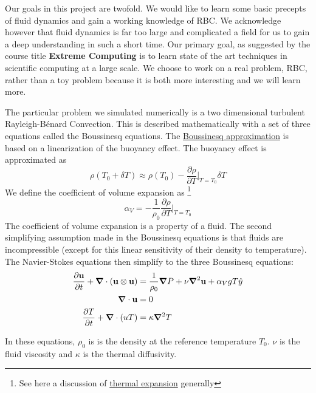 \documentclass[11pt]{article} %
\newcommand{\uu}{\vectorbold{u}}
\begin{document}
Our goals in this project are twofold.  
We would like to learn some basic precepts of fluid dynamics and gain a working knowledge of RBC.
We acknowledge however that fluid dynamics is far too large and complicated a field for us 
to gain a deep understanding in such a short time.
Our primary goal, as suggested by the course title \textbf{Extreme Computing}
is to learn state of the art techniques in scientific computing at a large scale.
We choose to work on a real problem, RBC, rather than a toy problem because
it is both more interesting and we will learn more.

The particular problem we simulated numerically is a two dimensional turbulent Rayleigh-B\'enard Convection.  
This is described mathematically with a set of three equations called the Boussinesq equations.
The \href{https://en.wikipedia.org/wiki/Boussinesq_approximation_(buoyancy)}{Boussinesq approximation} 
is based on a linearization of the buoyancy effect.
The buoyancy effect is approximated as 
$$ \rho(T_0 + \delta T) \approx \rho(T_0) - \frac{\partial \rho}{\partial T}\Bigr|_{T=T_0} \delta T$$
We define the coefficient of volume expansion as
\footnote{See here a discussion of  \href{https://en.wikipedia.org/wiki/Thermal_expansion}{thermal expansion} generally}
$$\alpha_V = -\frac{1}{\rho_0}\frac{\partial \rho}{\partial T}\Bigr|_{T=T_0}$$
The coefficient of volume expansion is a property of a fluid.
The second simplifying assumption made in the Boussinesq equations is that fluids are incompressible
(except for this linear sensitivity of their density to temperature).
The Navier-Stokes equations then simplify to the three Boussinesq equations:
\begin{align}
\frac{\partial \uu}{\partial t} + \grad \cdot (\uu \otimes \uu) &= \frac{1}{\rho_0} \grad P + \nu \grad^2 \uu + \alpha_V g T \hat{y} \\
\grad \cdot \uu &= 0 \\
\frac{\partial T}{\partial t} + \grad \cdot (uT) &= \kappa \grad^2 T
\end{align}

In these equations, $\rho_0$ is is the density at the reference temperature $T_0$.
$\nu$ is the fluid viscosity and $\kappa$ is the thermal diffusivity.
\end{document}
